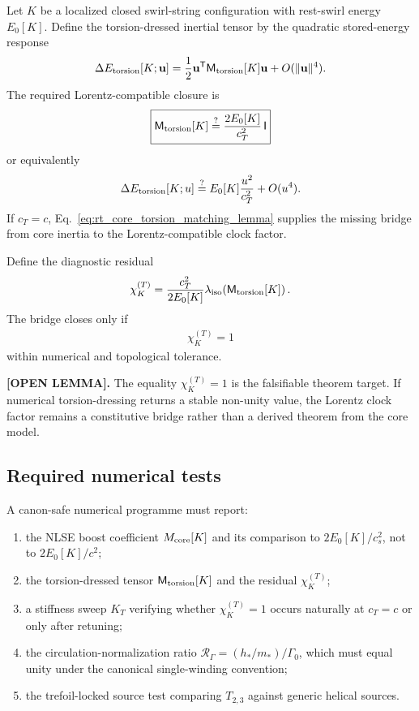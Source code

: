 Let \(K\) be a localized closed swirl-string configuration with rest-swirl energy \(E_0[K]\). Define the torsion-dressed inertial tensor by the quadratic stored-energy response
\begin{align}
    \Delta E_{\rm torsion}[K;\mathbf u]
    =
    \frac12\mathbf u^{\mathsf T}
    \mathsf M_{\rm torsion}[K]
    \mathbf u
    +O(\lVert\mathbf u\rVert^4).
\end{align}
The required Lorentz-compatible closure is
\begin{align}
    \boxed{
    \mathsf M_{\rm torsion}[K]
    \stackrel{?}{=}
    \frac{2E_0[K]}{c_T^2}\,\mathsf I
    }
    \label{eq:rt_core_torsion_matching_lemma}
\end{align}
or equivalently
\begin{align}
    \Delta E_{\rm torsion}[K;u]
    \stackrel{?}{=}
    E_0[K]\frac{u^2}{c_T^2}+O(u^4).
\end{align}
If \(c_T=c\), Eq.~\eqref{eq:rt_core_torsion_matching_lemma} supplies the missing bridge from core inertia to the Lorentz-compatible clock factor.

Define the diagnostic residual
\begin{align}
    \chi_K^{(T)}
    =
    \frac{c_T^2}{2E_0[K]}
    \lambda_{\rm iso}\!\left(\mathsf M_{\rm torsion}[K]\right).
\end{align}
The bridge closes only if
\begin{align}
    \chi_K^{(T)}=1
\end{align}
within numerical and topological tolerance.

\textbf{[OPEN LEMMA].}
The equality \(\chi_K^{(T)}=1\) is the falsifiable theorem target. If numerical torsion-dressing returns a stable non-unity value, the Lorentz clock factor remains a constitutive bridge rather than a derived theorem from the core model.

\subsection{Required numerical tests}

A canon-safe numerical programme must report:
\begin{enumerate}
    \item the NLSE boost coefficient \(M_{\rm core}[K]\) and its comparison to \(2E_0[K]/c_s^2\), not to \(2E_0[K]/c^2\);
    \item the torsion-dressed tensor \(\mathsf M_{\rm torsion}[K]\) and the residual \(\chi_K^{(T)}\);
    \item a stiffness sweep \(K_T\) verifying whether \(\chi_K^{(T)}=1\) occurs naturally at \(c_T=c\) or only after retuning;
    \item the circulation-normalization ratio \(\mathcal R_\Gamma=(h_*/m_*)/\Gamma_0\), which must equal unity under the canonical single-winding convention;
    \item the trefoil-locked source test comparing \(T_{2,3}\) against generic helical sources.
\end{enumerate}

